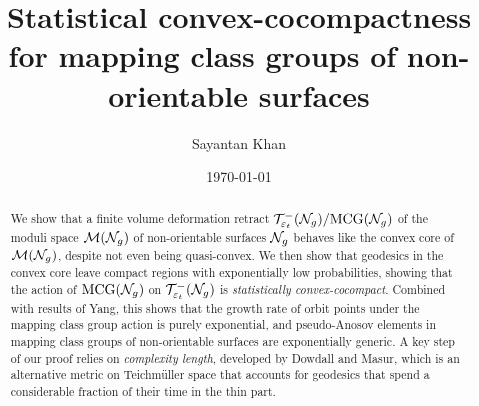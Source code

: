 \documentclass[12pt, reqno]{amsart}
\title[Statistical convex-cocompactness for non-orientable mapping class groups]{Statistical convex-cocompactness for mapping class groups of non-orientable surfaces}
\author{Sayantan Khan}
\date{\today}
\begin{document}
\begin{abstract}
  We show that a finite volume deformation retract $\mathcal{T}_{\varepsilon_t}^{-}(\mathcal{N}_g)/\mathrm{MCG}(\mathcal{N}_g)$ of the moduli space $\mathcal{M}(\mathcal{N}_g)$ of non-orientable surfaces $\mathcal{N}_g$ behaves like the convex core of $\mathcal{M}(\mathcal{N}_g)$, despite not even being quasi-convex.
  We then show that geodesics in the convex core leave compact regions with exponentially low probabilities, showing that the action of $\mathrm{MCG}(\mathcal{N}_g)$ on $\mathcal{T}_{\varepsilon_t}^{-}(\mathcal{N}_g)$ is \emph{statistically convex-cocompact}.
  Combined with results of Yang, this shows that the growth rate of orbit points under the mapping class group action is purely exponential, and pseudo-Anosov elements in mapping class groups of non-orientable surfaces are exponentially generic.
  A key step of our proof relies on \emph{complexity length}, developed by Dowdall and Masur, which is an alternative metric on Teichmüller space that accounts for geodesics that spend a considerable fraction of their time in the thin part.
\end{abstract}
\maketitle












\appendix



\printbibliography
\end{document}
